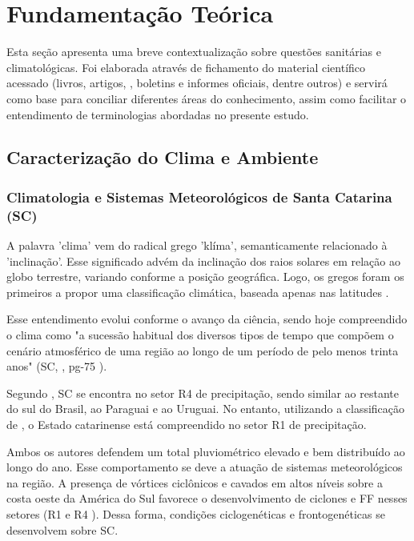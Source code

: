 \chapter{Fundamentação Teórica}

Esta seção apresenta uma breve contextualização sobre questões sanitárias e climatológicas. Foi elaborada através de  fichamento do material científico acessado (livros, artigos, , boletins e informes oficiais, dentre outros) e servirá como base para conciliar diferentes áreas do conhecimento, assim como facilitar o entendimento de terminologias abordadas no presente estudo.

\section{Caracterização do Clima e Ambiente}

\subsection{Climatologia e Sistemas Meteorológicos de Santa Catarina (SC)}

\indent A palavra 'clima' vem do radical grego 'klíma', semanticamente relacionado à 'inclinação'. Esse significado advém da inclinação dos raios solares em relação ao globo terrestre, variando conforme a posição geográfica. Logo, os gregos foram os primeiros a propor uma classificação climática, baseada apenas nas latitudes \cite{AtlasClimaticoSul}.

\indent Esse entendimento evolui conforme o avanço da ciência, sendo hoje compreendido o clima como "a sucessão habitual dos diversos tipos de tempo que compõem o cenário atmosférico de uma região ao longo de um período de pelo menos trinta anos" (\acrlong{SC}, \citeyear{AtlasSCnatureza}, pg-75 ).

\indent Segundo , \acrlong{SC} se encontra no setor R4 de precipitação, sendo similar ao restante do sul do Brasil, ao Paraguai e ao Uruguai. No entanto, utilizando a classificação de , o Estado catarinense está compreendido no setor R1 de precipitação.

\indent Ambos os autores defendem um total pluviométrico elevado e bem distribuído ao longo do ano. Esse comportamento se deve a atuação de sistemas meteorológicos na região. A presença de vórtices ciclônicos e cavados em altos níveis sobre a costa oeste da América do Sul favorece o desenvolvimento de ciclones e \acrlong{FF} nesses setores (R1 \cite{MERGEatual} e R4 \cite{reboita2010}). Dessa forma, condições ciclogenéticas e frontogenéticas se desenvolvem sobre \acrlong{SC}.

